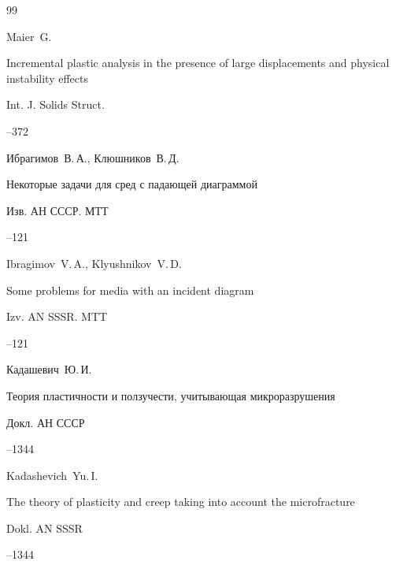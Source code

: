 \begin{thebibliography}{99}


\by Maier~G.

\paper Incremental plastic analysis in the presence of large displacements and physical instability effects

\jour Int. J. Solids Struct. 




--372




\by Ибрагимов~В.\,А., Клюшников~В.\,Д.

\paper Некоторые задачи для сред с падающей диаграммой

\jour Изв. АН СССР. МТТ



--121

\misctransl 

\by Ibragimov~V.\,A., Klyushnikov~V.\,D.

\paper Some problems for media with an incident diagram

\jour  Izv. AN SSSR. MTT



--121




\by Кадашевич~Ю.\,И.

\paper Теория пластичности и ползучести, учитывающая микроразрушения

\jour Докл. АН СССР




--1344

\misctransl

\by Kadashevich~Yu.\,I.

\paper The theory of plasticity and creep  taking into account the microfracture

\jour Dokl. AN SSSR




--1344




\end{thebibliography}
